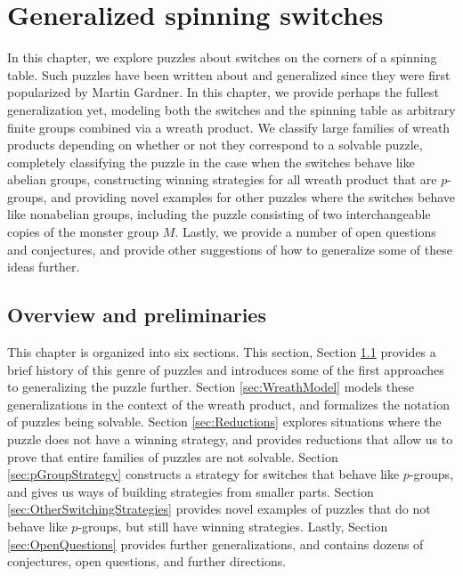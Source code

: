 \chapter{Generalized spinning switches}
\label{cha:SpinningSwitches}

In this chapter, we explore puzzles about switches on the corners of a
spinning table. Such puzzles have been written about and generalized since they
were first popularized by Martin Gardner.
In this chapter, we provide perhaps the fullest generalization yet, modeling
both the switches and the spinning table as arbitrary finite groups combined
via a wreath product. We classify large families of wreath products depending on
whether or not they correspond to a solvable puzzle,
completely classifying the puzzle in the case when the switches behave like abelian groups,
constructing winning strategies for all wreath product that are $p$-groups,
and providing novel examples for other puzzles where the switches behave like nonabelian groups,
including the puzzle consisting of two interchangeable copies of the monster group $M$.
Lastly, we provide a number of open questions and conjectures, and
provide other suggestions of how to generalize some of these ideas further.

\section{Overview and preliminaries}
\label{sec:overviewAndPreliminaries}
This chapter is organized into six sections.
This section,
Section \ref{sec:overviewAndPreliminaries} provides a brief history of this genre of puzzles and introduces some of the first approaches to generalizing the puzzle further.
Section \ref{sec:WreathModel} models these generalizations in the context of the wreath product, and formalizes the notation of puzzles being solvable.
Section \ref{sec:Reductions} explores situations where the puzzle does not have a winning strategy, and provides reductions that allow us to prove that entire families of puzzles are not solvable.
Section \ref{sec:pGroupStrategy} constructs a strategy for switches that behave like $p$-groups, and gives us ways of building strategies from smaller parts.
Section \ref{sec:OtherSwitchingStrategies} provides novel examples of puzzles that do not behave like $p$-groups, but still have winning strategies.
Lastly,
Section \ref{sec:OpenQuestions} provides further generalizations, and contains dozens of conjectures, open questions, and further directions.

